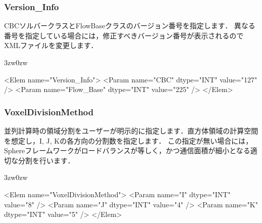 \pagebreak
\subsubsection{Version\_Info}

CBCソルバークラスとFlowBaseクラスの\hypertarget{tgt:version}{バージョン番号}を指定します．
異なる番号を指定している場合には，修正すべきバージョン番号が表示されるのでXMLファイルを変更します．

\begin{indentation}{3zw}{0zw}
\small
\begin{program}
<Elem name="Version_Info">
  <Param name="CBC"         dtype="INT"   value="127" />
  <Param name="Flow_Base"   dtype="INT"   value="225" />
</Elem>
\end{program}

\end{indentation}


\pagebreak
\subsubsection{VoxelDivisionMethod}
並列計算時の\hypertarget{tgt:voxel_division_method}{領域分割}をユーザーが明示的に指定します．直方体領域の計算空間を想定し，I, J, Kの各方向の分割数を指定します．
この指定が無い場合には，Sphereフレームワークがロードバランスが等しく，かつ通信面積が細小となる適切な分割を行います．

\begin{indentation}{3zw}{0zw}
\small
\begin{program}
<Elem name="VoxelDivisionMethod">
  <Param name="I"   dtype="INT"   value="8" />
  <Param name="J"   dtype="INT"   value="4" />
  <Param name="K"   dtype="INT"   value="5" />
</Elem>
\end{program}

\end{indentation}

